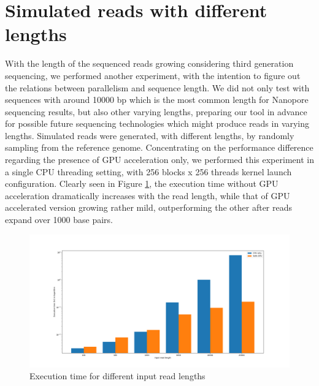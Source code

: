 \documentclass{PHlab-thesis}
\begin{document}
\section{Simulated reads with different lengths}
With the length of the sequenced reads growing considering third generation sequencing, we performed another experiment, with the intention to figure out the relations between parallelism and sequence length. We did not only test with sequences with around 10000 bp which is the most common length for Nanopore sequencing results, but also other varying lengths, preparing our tool in advance for possible future sequencing technologies which might produce reads in varying lengths. Simulated reads were generated, with different lengths, by randomly sampling from the reference genome. Concentrating on the performance difference regarding the presence of GPU acceleration only, we performed this experiment in a single CPU threading setting, with 256 blocks x 256 threads kernel launch configuration. Clearly seen in Figure \ref{fig:readlen}, the execution time without GPU acceleration dramatically increases with the read length, while that of GPU accelerated version growing rather mild, outperforming the other after reads expand over 1000 base pairs.
\begin{figure}
	\centering
	\includegraphics[scale=0.3]{figures/readlen.png}
	\caption{Execution time for different input read lengths}
	\label{fig:readlen} 
\end{figure}
\end{document}
